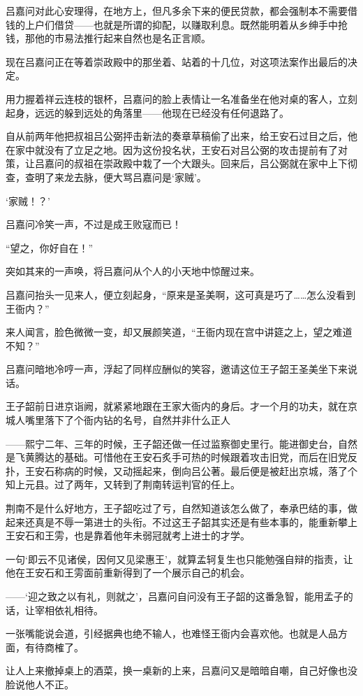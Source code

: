吕嘉问对此心安理得，在地方上，但凡多余下来的便民贷款，都会强制本不需要借钱的上户们借贷——也就是所谓的抑配，以赚取利息。既然能明着从乡绅手中抢钱，那他的市易法推行起来自然也是名正言顺。

现在吕嘉问正在等着崇政殿中的那坐着、站着的十几位，对这项法案作出最后的决定。

用力握着祥云连枝的银杯，吕嘉问的脸上表情让一名准备坐在他对桌的客人，立刻起身，远远的躲到远处的角落里——他现在已经没有任何退路了。

自从前两年他把叔祖吕公弼抨击新法的奏章草稿偷了出来，给王安石过目之后，他在家中就没有了立足之地。因为这份投名状，王安石对吕公弼的攻击提前有了对策，让吕嘉问的叔祖在崇政殿中栽了一个大跟头。回来后，吕公弼就在家中上下彻查，查明了来龙去脉，便大骂吕嘉问是‘家贼’。

‘家贼！？’

吕嘉问冷笑一声，不过是成王败寇而已！

“望之，你好自在！”

突如其来的一声唤，将吕嘉问从个人的小天地中惊醒过来。

吕嘉问抬头一见来人，便立刻起身，“原来是圣美啊，这可真是巧了……怎么没看到王衙内？”

来人闻言，脸色微微一变，却又展颜笑道，“王衙内现在宫中讲筵之上，望之难道不知？”

吕嘉问暗地冷哼一声，浮起了同样应酬似的笑容，邀请这位王子韶王圣美坐下来说话。

王子韶前日进京诣阙，就紧紧地跟在王家大衙内的身后。才一个月的功夫，就在京城人嘴里落下了个衙内钻的名号，自然并非什么正人

——熙宁二年、三年的时候，王子韶还做一任过监察御史里行。能进御史台，自然是飞黄腾达的基础。可惜他在王安石炙手可热的时候跟着攻击旧党，而后在旧党反扑，王安石称病的时候，又动摇起来，倒向吕公著。最后便是被赶出京城，落了个知上元县。过了两年，又转到了荆南转运判官的任上。

荆南不是什么好地方，王子韶吃过了亏，自然知道该怎么做了，奉承巴结的事，做起来还真是不辱一第进士的头衔。不过这王子韶其实还是有些本事的，能重新攀上王安石和王雱，也是靠着他年未弱冠就考上进士的才学。

一句‘即云不见诸侯，因何又见梁惠王’，就算孟轲复生也只能勉强自辩的指责，让他在王安石和王雱面前重新得到了一个展示自己的机会。

——‘迎之致之以有礼，则就之’，吕嘉问自问没有王子韶的这番急智，能用孟子的话，让宰相依礼相待。

一张嘴能说会道，引经据典也绝不输人，也难怪王衙内会喜欢他。也就是人品方面，有待商榷了。

让人上来撤掉桌上的酒菜，换一桌新的上来，吕嘉问又是暗暗自嘲，自己好像也没脸说他人不正。

